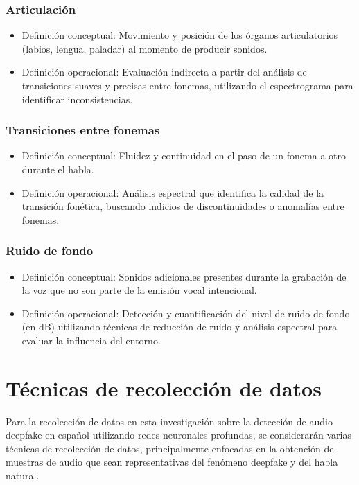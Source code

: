 \subsubsection{Articulación}

\begin{itemize}
	\item Definición conceptual: Movimiento y posición de los órganos articulatorios (labios, lengua, paladar) al momento de producir sonidos.
	\item Definición operacional: Evaluación indirecta a partir del análisis de transiciones suaves y precisas entre fonemas, utilizando el espectrograma para identificar inconsistencias.
\end{itemize}

\subsubsection{Transiciones entre fonemas}

\begin{itemize}
	\item Definición conceptual: Fluidez y continuidad en el paso de un fonema a otro durante el habla.
	\item Definición operacional: Análisis espectral que identifica la calidad de la transición fonética, buscando indicios de discontinuidades o anomalías entre fonemas.
\end{itemize}

\subsubsection{Ruido de fondo}

\begin{itemize}
	\item Definición conceptual: Sonidos adicionales presentes durante la grabación de la voz que no son parte de la emisión vocal intencional.
	\item Definición operacional: Detección y cuantificación del nivel de ruido de fondo (en dB) utilizando técnicas de reducción de ruido y análisis espectral para evaluar la influencia del entorno.
\end{itemize}

\section{Técnicas de recolección de datos}

Para la recolección de datos en esta investigación sobre la detección de audio deepfake en español utilizando redes neuronales profundas, se considerarán varias técnicas de recolección de datos, principalmente enfocadas en la obtención de muestras de audio que sean representativas del fenómeno deepfake y del habla natural.

